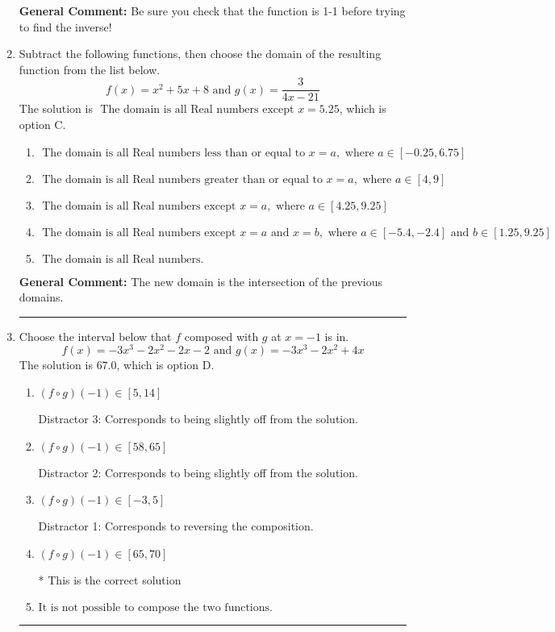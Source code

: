 \documentclass{extbook}[14pt]
\newcommand{\litem}[1]{\item #1

\rule{\textwidth}{0.4pt}}
\begin{document}
\begin{enumerate}
{\textbf{General Comment:} Be sure you check that the function is 1-1 before trying to find the inverse!
}
\litem{
Subtract the following functions, then choose the domain of the resulting function from the list below.
\[ f(x) = x^{2} +5 x + 8 \text{ and } g(x) = \frac{3}{4x-21} \]The solution is \( \text{ The domain is all Real numbers except } x = 5.25 \), which is option C.\begin{enumerate}[label=\Alph*.]
\item \( \text{ The domain is all Real numbers less than or equal to } x = a, \text{ where } a \in [-0.25, 6.75] \)


\item \( \text{ The domain is all Real numbers greater than or equal to } x = a, \text{ where } a \in [4, 9] \)


\item \( \text{ The domain is all Real numbers except } x = a, \text{ where } a \in [4.25, 9.25] \)


\item \( \text{ The domain is all Real numbers except } x = a \text{ and } x = b, \text{ where } a \in [-5.4, -2.4] \text{ and } b \in [1.25, 9.25] \)


\item \( \text{ The domain is all Real numbers. } \)


\end{enumerate}

\textbf{General Comment:} The new domain is the intersection of the previous domains.
}
\litem{
Choose the interval below that $f$ composed with $g$ at $x=-1$ is in.
\[ f(x) = -3x^{3} -2 x^{2} -2 x -2 \text{ and } g(x) = -3x^{3} -2 x^{2} +4 x \]The solution is \( 67.0 \), which is option D.\begin{enumerate}[label=\Alph*.]
\item \( (f \circ g)(-1) \in [5, 14] \)

 Distractor 3: Corresponds to being slightly off from the solution.
\item \( (f \circ g)(-1) \in [58, 65] \)

 Distractor 2: Corresponds to being slightly off from the solution.
\item \( (f \circ g)(-1) \in [-3, 5] \)

 Distractor 1: Corresponds to reversing the composition.
\item \( (f \circ g)(-1) \in [65, 70] \)

* This is the correct solution
\item \( \text{It is not possible to compose the two functions.} \)



\end{enumerate}}
\end{enumerate}
\end{document}

